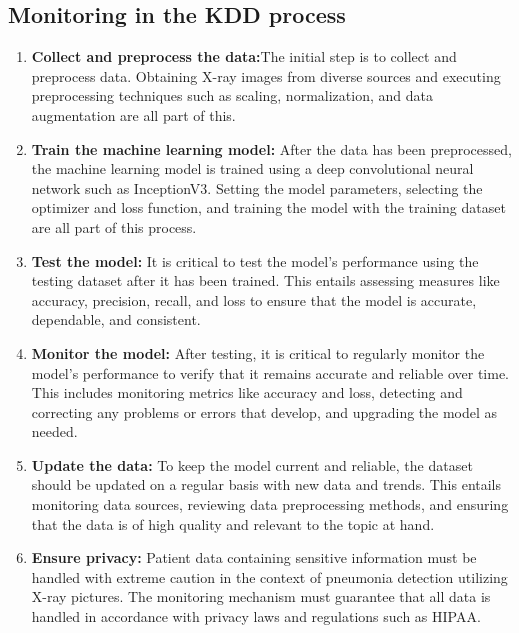 \subsection{Monitoring in the KDD process}
\begin{enumerate}
	\item \textbf{Collect and preprocess the data:}The initial step is to collect and preprocess data. Obtaining X-ray images from diverse sources and executing preprocessing techniques such as scaling, normalization, and data augmentation are all part of this. \\
	\item \textbf{Train the machine learning model:} After the data has been preprocessed, the machine learning model is trained using a deep convolutional neural network such as InceptionV3. Setting the model parameters, selecting the optimizer and loss function, and training the model with the training dataset are all part of this process.\\
	\item \textbf{Test the model:} It is critical to test the model's performance using the testing dataset after it has been trained. This entails assessing measures like accuracy, precision, recall, and loss to ensure that the model is accurate, dependable, and consistent.\\
	\item \textbf{Monitor the model:} After testing, it is critical to regularly monitor the model's performance to verify that it remains accurate and reliable over time. This includes monitoring metrics like accuracy and loss, detecting and correcting any problems or errors that develop, and upgrading the model as needed.\\
	\item \textbf{Update the data:} To keep the model current and reliable, the dataset should be updated on a regular basis with new data and trends. This entails monitoring data sources, reviewing data preprocessing methods, and ensuring that the data is of high quality and relevant to the topic at hand.\\
	\item \textbf{Ensure privacy:} Patient data containing sensitive information must be handled with extreme caution in the context of pneumonia detection utilizing X-ray pictures. The monitoring mechanism must guarantee that all data is handled in accordance with privacy laws and regulations such as HIPAA.\\
\end{enumerate}

